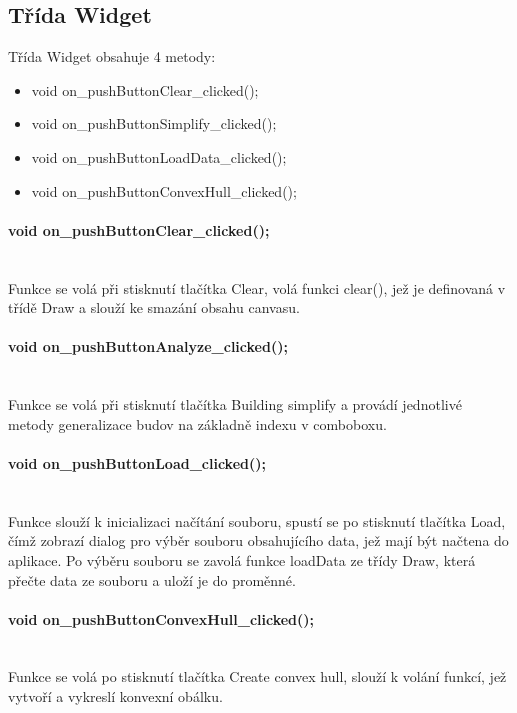 \documentclass[11pt]{article}
\begin{document}
 	\subsection{Třída Widget}
 	Třída Widget obsahuje 4 metody:
 	
 	\begin{itemize}
 		\item void on\_pushButtonClear\_clicked();
 		\item void on\_pushButtonSimplify\_clicked();
 		\item void on\_pushButtonLoadData\_clicked();
 		\item void on\_pushButtonConvexHull\_clicked();
 		
 	\end{itemize}
 	
 	\paragraph{ void on\_pushButtonClear\_clicked();}\mbox{}\\
 	Funkce se volá při stisknutí tlačítka Clear, volá funkci clear(), jež je definovaná v třídě Draw a slouží ke smazání obsahu canvasu.
 	
 	\paragraph{ void on\_pushButtonAnalyze\_clicked();}\mbox{}\\
 	Funkce se volá při stisknutí tlačítka Building simplify a provádí jednotlivé metody generalizace budov na základně indexu v comboboxu. 
 	
 	\paragraph{void on\_pushButtonLoad\_clicked();}\mbox{}\\
 	Funkce slouží k inicializaci načítání souboru, spustí se po stisknutí tlačítka Load, čímž zobrazí dialog pro výběr souboru obsahujícího data, jež mají být načtena do aplikace. Po výběru souboru se zavolá funkce loadData ze třídy Draw, která přečte data ze souboru a uloží je do proměnné.
 	
	\paragraph{void on\_pushButtonConvexHull\_clicked();}\mbox{}\\
	Funkce se volá po stisknutí tlačítka Create convex hull, slouží k volání funkcí, jež vytvoří a vykreslí konvexní obálku. 
	
\end{document}
